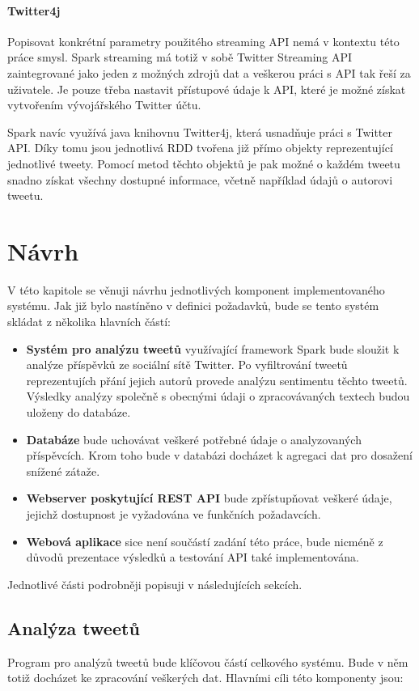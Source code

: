 \documentclass[thesis=B,czech]{FITthesis}[2012/06/26]
\begin{document}
\subsubsection{Twitter4j}
	Popisovat konkrétní parametry použitého streaming API nemá v kontextu této práce smysl. Spark streaming má totiž v sobě Twitter Streaming API zaintegrované jako jeden z možných zdrojů dat a veškerou práci s API tak řeší za uživatele. Je pouze třeba nastavit přístupové údaje k API, které je možné získat vytvořením vývojářského Twitter účtu. 
	
	Spark navíc využívá java knihovnu Twitter4j\cite{twitter4j}, která usnadňuje práci s Twitter API. Díky tomu jsou jednotlivá RDD tvořena již přímo objekty reprezentující jednotlivé tweety. Pomocí metod těchto objektů je pak možné o každém tweetu snadno získat všechny dostupné informace, včetně například údajů o autorovi tweetu. 


\chapter{Návrh}
\label{navrh}
V této kapitole se věnuji návrhu jednotlivých komponent implementovaného systému. Jak již bylo nastíněno v definici požadavků, bude se tento systém skládat z několika hlavních částí: 
\begin{itemize}
\item \textbf{Systém pro analýzu tweetů} využívající framework Spark bude sloužit k analýze příspěvků ze sociální sítě Twitter. Po vyfiltrování tweetů reprezentujích přání jejich autorů provede analýzu sentimentu těchto tweetů. Výsledky analýzy společně s obecnými údaji o zpracovávaných textech budou uloženy do databáze. 
\item \textbf{Databáze} bude uchovávat veškeré potřebné údaje o analyzovaných příspěvcích. Krom toho bude v databázi docházet k agregaci dat pro dosažení snížené zátaže. 
\item \textbf{Webserver poskytující REST API} bude zpřístupňovat veškeré údaje, jejichž dostupnost je vyžadována ve funkčních požadavcích. 
\item \textbf{Webová aplikace} sice není součástí zadání této práce, bude nicméně z důvodů prezentace výsledků a testování API také implementována. 
\end{itemize}

\noindent Jednotlivé části podrobněji popisuji v následujících sekcích. 

\section{Analýza tweetů}
	Program pro analýzů tweetů bude klíčovou částí celkového systému. Bude v něm totiž docházet ke zpracování veškerých dat. Hlavními cíli této komponenty jsou:
	
\end{document}
